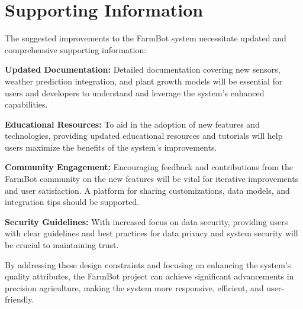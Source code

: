 \section{Supporting Information}

The suggested improvements to the FarmBot system necessitate updated and comprehensive supporting information:

\textbf{Updated Documentation:} Detailed documentation covering new sensors, weather prediction integration, and plant growth models will be essential for users and developers to understand and leverage the system's enhanced capabilities.

\textbf{Educational Resources:} To aid in the adoption of new features and technologies, providing updated educational resources and tutorials will help users maximize the benefits of the system's improvements.

\textbf{Community Engagement:} Encouraging feedback and contributions from the FarmBot community on the new features will be vital for iterative improvements and user satisfaction. A platform for sharing customizations, data models, and integration tips should be supported.

\textbf{Security Guidelines:} With increased focus on data security, providing users with clear guidelines and best practices for data privacy and system security will be crucial to maintaining trust.

By addressing these design constraints and focusing on enhancing the system's quality attributes, the FarmBot project can achieve significant advancements in precision agriculture, making the system more responsive, efficient, and user-friendly.


